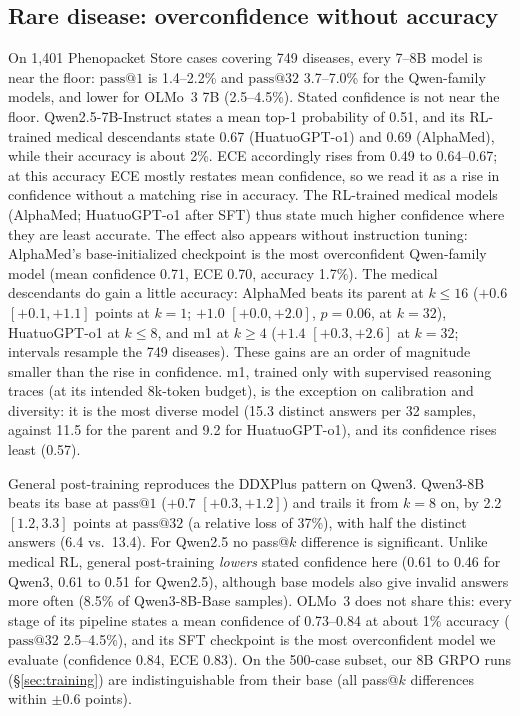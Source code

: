 \documentclass[11pt]{article}
\makeatletter
\newcommand{\passk}[1]{\mathrm{pass@}#1}
\makeatother
\begin{document}
\subsection{Rare disease: overconfidence without accuracy}\label{sec:rare}
On 1,401 Phenopacket Store cases covering 749 diseases, every 7--8B model is near the floor: $\passk{1}$ is 1.4--2.2\% and $\passk{32}$ 3.7--7.0\% for the Qwen-family models, and lower for OLMo~3 7B (2.5--4.5\%).
Stated confidence is not near the floor. Qwen2.5-7B-Instruct states a mean top-1 probability of 0.51, and its RL-trained medical descendants state 0.67 (HuatuoGPT-o1) and 0.69 (AlphaMed), while their accuracy is about 2\%. ECE accordingly rises from 0.49 to 0.64--0.67; at this accuracy ECE mostly restates mean confidence, so we read it as a rise in confidence without a matching rise in accuracy.
The RL-trained medical models (AlphaMed; HuatuoGPT-o1 after SFT) thus state much higher confidence where they are least accurate. The effect also appears without instruction tuning: AlphaMed's base-initialized checkpoint is the most overconfident Qwen-family model (mean confidence 0.71, ECE 0.70, accuracy 1.7\%).
The medical descendants do gain a little accuracy: AlphaMed beats its parent at $k \le 16$ ($+0.6$ $[+0.1,+1.1]$ points at $k{=}1$; $+1.0$ $[+0.0,+2.0]$, $p{=}0.06$, at $k{=}32$), HuatuoGPT-o1 at $k \le 8$, and m1 at $k \ge 4$ ($+1.4$ $[+0.3,+2.6]$ at $k{=}32$; intervals resample the 749 diseases). These gains are an order of magnitude smaller than the rise in confidence.
m1, trained only with supervised reasoning traces (at its intended 8k-token budget), is the exception on calibration and diversity: it is the most diverse model (15.3 distinct answers per 32 samples, against 11.5 for the parent and 9.2 for HuatuoGPT-o1), and its confidence rises least (0.57).

General post-training reproduces the DDXPlus pattern on Qwen3. Qwen3-8B beats its base at $\passk{1}$ ($+0.7$ $[+0.3,+1.2]$) and trails it from $k{=}8$ on, by 2.2 $[1.2,3.3]$ points at $\passk{32}$ (a relative loss of 37\%), with half the distinct answers (6.4 vs.\ 13.4). For Qwen2.5 no pass@$k$ difference is significant.
Unlike medical RL, general post-training \emph{lowers} stated confidence here (0.61 to 0.46 for Qwen3, 0.61 to 0.51 for Qwen2.5), although base models also give invalid answers more often (8.5\% of Qwen3-8B-Base samples).
OLMo~3 does not share this: every stage of its pipeline states a mean confidence of 0.73--0.84 at about 1\% accuracy ($\passk{32}$ 2.5--4.5\%), and its SFT checkpoint is the most overconfident model we evaluate (confidence 0.84, ECE 0.83).
On the 500-case subset, our 8B GRPO runs (\S\ref{sec:training}) are indistinguishable from their base (all pass@$k$ differences within $\pm0.6$ points).
\end{document}
